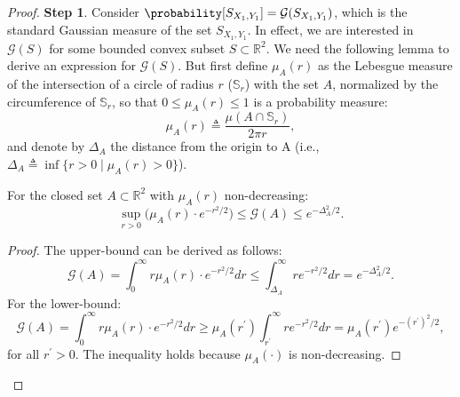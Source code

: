 \begin{proof}
    \textbf{Step 1}.
    Consider $\probability[S_{X_1, Y_1}] = \mathcal{G}(S_{X_1, Y_1})$, which is the standard Gaussian
    measure of the set $S_{X_1, Y_1}$. In effect, we are interested in $\mathcal{G}(S)$ for some
    bounded convex subset $S \subset \mathbb{R}^2$. We need the following lemma to derive an expression
    for $\mathcal{G}(S)$. But first define $\mu_A(r)$ as the Lebesgue measure of the intersection of a circle
    of radius $r$ ($\mathbb{S}_r$) with the set $A$, normalized by the circumference of $\mathbb{S}_r$,
    so that $0 \leq \mu_A(r) \leq 1$ is a probability measure:
    \begin{equation*}
        \mu_A(r) \triangleq \frac{\mu(A \cap \mathbb{S}_r)}{2 \pi r},
    \end{equation*}
    and denote by $\Delta_A$ the distance from the origin to A (i.e., $\Delta_A \triangleq \inf \{ r > 0 \;|\; \mu_A(r) > 0 \}$).

    \begin{lemma}
        For the closed set $A \subset \mathbb{R}^2$ with $\mu_A(r)$ non-decreasing:
        \begin{equation*}
            \sup_{r > 0} \Big( \mu_A(r) \cdot e^{-r^2/2} \Big) \leq \mathcal{G}(A) \leq e^{-\Delta^2_A/2}.
        \end{equation*}
    \end{lemma}
    \begin{proof}
        The upper-bound can be derived as follows:
        \begin{equation*}
            \mathcal{G}(A) = \int_0^\infty r \mu_A(r) \cdot e^{-r^2/2} dr \leq \int_{\Delta_A}^\infty r e^{-r^2/2} dr = e^{-\Delta_A^2/2}.
        \end{equation*}
        For the lower-bound:
        \begin{equation*}
            \mathcal{G}(A) = \int_0^\infty r \mu_A(r) \cdot e^{-r^2/2} dr \geq \mu_A(r^\prime) \int_{r^\prime}^\infty r e^{-r^2/2} dr =
            \mu_A(r^\prime) e^{-(r^\prime)^2/2},
        \end{equation*}
        for all $r^\prime > 0$. The inequality holds because $\mu_A(\cdot)$ is non-decreasing.
    \end{proof}


\end{proof}
